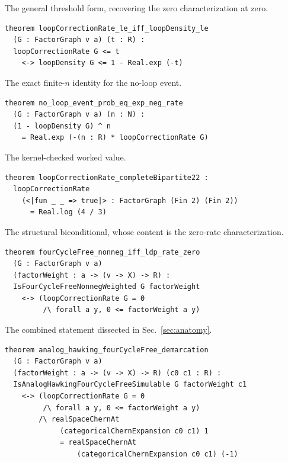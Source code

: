 \documentclass[aps,prx,reprint,nofootinbib,floatfix]{revtex4-2}
\begin{document}
The general threshold form, recovering the zero characterization at zero.

{\footnotesize
\begin{lstlisting}[basicstyle=\ttfamily,columns=fullflexible,keepspaces=true,showstringspaces=false,breaklines=true,breakatwhitespace=true,breakindent=1em]
theorem loopCorrectionRate_le_iff_loopDensity_le
  (G : FactorGraph v a) (t : R) :
  loopCorrectionRate G <= t
    <-> loopDensity G <= 1 - Real.exp (-t)
\end{lstlisting}
}

The exact finite-$n$ identity for the no-loop event.

{\footnotesize
\begin{lstlisting}[basicstyle=\ttfamily,columns=fullflexible,keepspaces=true,showstringspaces=false,breaklines=true,breakatwhitespace=true,breakindent=1em]
theorem no_loop_event_prob_eq_exp_neg_rate
  (G : FactorGraph v a) (n : N) :
  (1 - loopDensity G) ^ n
    = Real.exp (-(n : R) * loopCorrectionRate G)
\end{lstlisting}
}

The kernel-checked worked value.

{\footnotesize
\begin{lstlisting}[basicstyle=\ttfamily,columns=fullflexible,keepspaces=true,showstringspaces=false,breaklines=true,breakatwhitespace=true,breakindent=1em]
theorem loopCorrectionRate_completeBipartite22 :
  loopCorrectionRate
    (<|fun _ _ => true|> : FactorGraph (Fin 2) (Fin 2))
      = Real.log (4 / 3)
\end{lstlisting}
}

The structural biconditional, whose content is the zero-rate characterization.

{\footnotesize
\begin{lstlisting}[basicstyle=\ttfamily,columns=fullflexible,keepspaces=true,showstringspaces=false,breaklines=true,breakatwhitespace=true,breakindent=1em]
theorem fourCycleFree_nonneg_iff_ldp_rate_zero
  (G : FactorGraph v a)
  (factorWeight : a -> (v -> X) -> R) :
  IsFourCycleFreeNonnegWeighted G factorWeight
    <-> (loopCorrectionRate G = 0
         /\ forall a y, 0 <= factorWeight a y)
\end{lstlisting}
}

The combined statement dissected in Sec.~\ref{sec:anatomy}.

{\footnotesize
\begin{lstlisting}[basicstyle=\ttfamily,columns=fullflexible,keepspaces=true,showstringspaces=false,breaklines=true,breakatwhitespace=true,breakindent=1em]
theorem analog_hawking_fourCycleFree_demarcation
  (G : FactorGraph v a)
  (factorWeight : a -> (v -> X) -> R) (c0 c1 : R) :
  IsAnalogHawkingFourCycleFreeSimulable G factorWeight c1
    <-> (loopCorrectionRate G = 0
         /\ forall a y, 0 <= factorWeight a y)
        /\ realSpaceChernAt
             (categoricalChernExpansion c0 c1) 1
             = realSpaceChernAt
                 (categoricalChernExpansion c0 c1) (-1)
\end{lstlisting}
}
\end{document}
